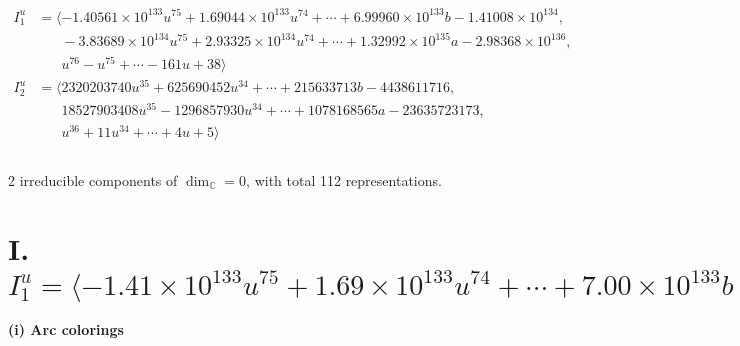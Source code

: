 \documentclass[1p]{elsarticle_modified}
\theoremstyle{definition}
\begin{document}
\begin{align*}
I^u_{1}&=\langle 
-1.40561\times10^{133} u^{75}+1.69044\times10^{133} u^{74}+\cdots+6.99960\times10^{133} b-1.41008\times10^{134},\\
\phantom{I^u_{1}}&\phantom{= \langle  }-3.83689\times10^{134} u^{75}+2.93325\times10^{134} u^{74}+\cdots+1.32992\times10^{135} a-2.98368\times10^{136},\\
\phantom{I^u_{1}}&\phantom{= \langle  }u^{76}- u^{75}+\cdots-161 u+38\rangle \\
I^u_{2}&=\langle 
2320203740 u^{35}+625690452 u^{34}+\cdots+215633713 b-4438611716,\\
\phantom{I^u_{2}}&\phantom{= \langle  }18527903408 u^{35}-1296857930 u^{34}+\cdots+1078168565 a-23635723173,\\
\phantom{I^u_{2}}&\phantom{= \langle  }u^{36}+11 u^{34}+\cdots+4 u+5\rangle \\
\\
\end{align*}
\raggedright * 2 irreducible components of $\dim_{\mathbb{C}}=0$, with total 112 representations.\\
\newpage
\renewcommand{\arraystretch}{1}
\centering \section*{I. $I^u_{1}= \langle -1.41\times10^{133} u^{75}+1.69\times10^{133} u^{74}+\cdots+7.00\times10^{133} b-1.41\times10^{134},\;-3.84\times10^{134} u^{75}+2.93\times10^{134} u^{74}+\cdots+1.33\times10^{135} a-2.98\times10^{136},\;u^{76}- u^{75}+\cdots-161 u+38 \rangle$}
\flushleft \textbf{(i) Arc colorings}\\
\end{document}
